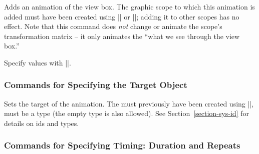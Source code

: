 \begin{command}{\pgfsys@animateviewbox}
  Adds an animation of the view box. The graphic scope to which this
  animation is added must have been created using
  |\pgfsys@viewboxmeet| or |\pgfsys@viewboxslice|; adding it to other
  scopes has no effect. Note   that this command does \emph{not}
  change or animate the scope's transformation matrix -- it only animates the
  ``what we see through the view box.''
  
  Specify values with |\pgfsys@animation@viewbox|.
\begin{codeexample}[width=2.3cm]
\end{codeexample}
\end{command}


\subsubsection{Commands for Specifying the Target Object}

\begin{command}{\pgfsys@animation@whom{}}
  Sets the target of the animation. The  must previously have
  been created using |\pgfsys@new@id|,  must be a type (the
  empty type is also allowed). See Section~\ref{section-sys-id} for
  details on ids and types.
\end{command}


\subsubsection{Commands for Specifying Timing: Duration and Repeats}

